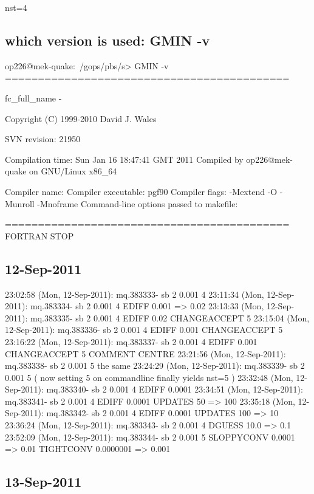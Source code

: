 
nst=4

\subsection{which version is used: GMIN -v }

op226@mek-quake:~/gops/pbs/s> GMIN -v
===========================================

fc_full_name -

Copyright (C) 1999-2010 David J. Wales

SVN revision: 21950

Compilation time: Sun Jan 16 18:47:41 GMT 2011
Compiled by op226@mek-quake on GNU/Linux x86_64

Compiler name:
Compiler executable:  pgf90
Compiler flags: -Mextend -O -Munroll -Mnoframe
Command-line options passed to makefile:

===========================================
FORTRAN STOP

\subsection{12-Sep-2011}

23:02:58 (Mon, 12-Sep-2011):
	mq.383333- sb 2 0.001 4
23:11:34 (Mon, 12-Sep-2011):
	mq.383334- sb 2 0.001 4  
							EDIFF 0.001 => 0.02
23:13:33 (Mon, 12-Sep-2011):
	mq.383335- sb 2 0.001 4  
							EDIFF 0.02
							CHANGEACCEPT 5
23:15:04 (Mon, 12-Sep-2011):
	mq.383336- sb 2 0.001 4  
							EDIFF 0.001
							CHANGEACCEPT 5
23:16:22 (Mon, 12-Sep-2011):
	mq.383337- sb 2 0.001 4  
							EDIFF 0.001
							CHANGEACCEPT 5
							COMMENT CENTRE
23:21:56 (Mon, 12-Sep-2011):
	mq.383338- sb 2 0.001 5  
							the same
23:24:29 (Mon, 12-Sep-2011):
	mq.383339- sb 2 0.001 5  
							( now setting 5 on commandline finally yields nst=5 )
23:32:48 (Mon, 12-Sep-2011):
	mq.383340- sb 2 0.001 4  
							EDIFF 0.0001
23:34:51 (Mon, 12-Sep-2011):
	mq.383341- sb 2 0.001 4  
							EDIFF 0.0001
							UPDATES 50 => 100
23:35:18 (Mon, 12-Sep-2011):
	mq.383342- sb 2 0.001 4  
							EDIFF 0.0001
							UPDATES 100 => 10
23:36:24 (Mon, 12-Sep-2011):
	mq.383343- sb 2 0.001 4  
							DGUESS 10.0 => 0.1 
23:52:09 (Mon, 12-Sep-2011):
	mq.383344- sb 2 0.001 5
							SLOPPYCONV 0.0001 => 0.01
							TIGHTCONV  0.0000001 => 0.001
 
\subsection{13-Sep-2011}

